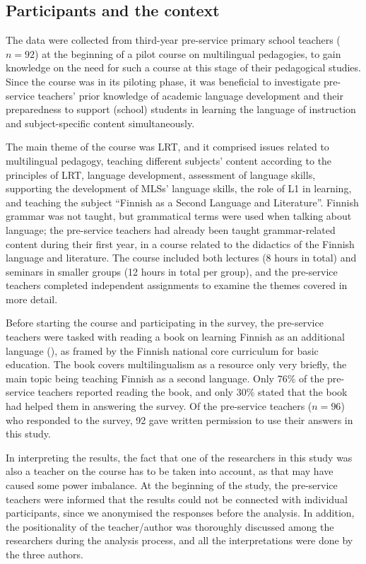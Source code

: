 \documentclass[output=paper]{langscibook}
\begin{document}
\subsection{Participants and the context}\label{sec:alisaari:3.2} %

The data were collected from third-year pre-service primary school teachers ($n = 92$) at the beginning of a pilot course on multilingual pedagogies, to gain knowledge on the need for such a course at this stage of their pedagogical studies. Since the course was in its piloting phase, it was beneficial to investigate pre-service teachers’ prior knowledge of academic language development and their preparedness to support (school) students in learning the language of instruction and subject-specific content simultaneously. 

The main theme of the course was LRT, and it comprised issues related to multilingual pedagogy, teaching different subjects’ content according to the principles of LRT, language development, assessment of language skills, supporting the development of MLSs’ language skills, the role of L1 in learning, and teaching the subject “Finnish as a Second Language and Literature”. Finnish grammar was not taught, but grammatical terms were used when talking about language; the pre-service teachers had already been taught grammar-related content during their first year, in a course related to the didactics of the Finnish language and literature. The course included both lectures (8 hours in total) and seminars in smaller groups (12 hours in total per group), and the pre-service teachers completed independent assignments to examine the themes covered in more detail.

Before starting the course and participating in the survey, the pre-service teachers were tasked with reading a book on learning Finnish as an additional language (\citealt{VaaralaEtAl2016}), as framed by the Finnish national core curriculum for basic education. The book covers multilingualism as a resource only very briefly, the main topic being teaching Finnish as a second language. Only 76\% of the pre-service teachers reported reading the book, and only 30\% stated that the book had helped them in answering the survey. Of the pre-service teachers ($n = 96$) who responded to the survey, 92 gave written permission to use their answers in this study.

In interpreting the results, the fact that one of the researchers in this study was also a teacher on the course has to be taken into account, as that may have caused some power imbalance. At the beginning of the study, the pre-service teachers were informed that the results could not be connected with individual participants, since we anonymised the responses before the analysis. In addition, the positionality of the teacher/author was thoroughly discussed among the researchers during the analysis process, and all the interpretations were done by the three authors.
\end{document}
